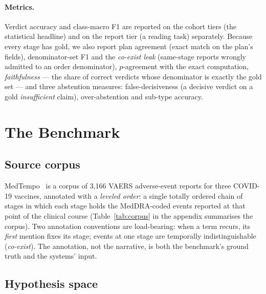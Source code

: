 \paragraph{Metrics.} Verdict accuracy and class-macro F1 are reported on the
cohort tiers (the statistical headline) and on the report tier (a reading
task) separately. Because every stage has gold, we also report plan agreement
(exact match on the plan's fields), denominator-set F1 and the \emph{co-exist
leak} (same-stage reports wrongly admitted to an order denominator),
$p$-agreement with the exact computation, \emph{faithfulness} --- the share of
correct verdicts whose denominator is exactly the gold set --- and three
abstention measures: false-decisiveness (a decisive verdict on a gold
\emph{insufficient} claim), over-abstention and sub-type accuracy.

\section{The \sys{} Benchmark}
\label{sec:dataset}

\subsection{Source corpus}
\label{sec:corpus}

MedTempo~\cite{medtempo2026} is a corpus of 3{,}166 VAERS adverse-event
reports for three COVID-19 vaccines, annotated with a \emph{leveled order}: a
single totally ordered chain of stages in which each stage holds the
MedDRA-coded events reported at that point of the clinical course
(Table~\ref{tab:corpus} in the appendix summarises the corpus). Two annotation
conventions are load-bearing: when a term recurs, its \emph{first} mention
fixes its stage; events at one stage are temporally indistinguishable
(\emph{co-exist}). The annotation, not the narrative, is both the benchmark's
ground truth and the systems' input.

\subsection{Hypothesis space}
\label{sec:space}

